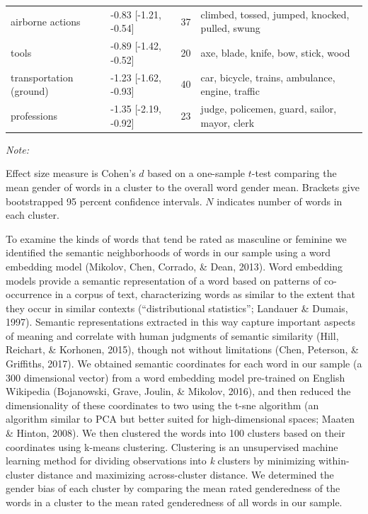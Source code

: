 \documentclass[
  english,
  ,man,floatsintext]{apa6}
\begin{document}
\begin{table}
{\begin{threeparttable}
\begin{tabular}[t]{llrl}
\hspace{1em}airborne actions & -0.83 [-1.21, -0.54] & 37 & climbed, tossed, jumped, knocked, pulled, swung\\
\hspace{1em}tools & -0.89 [-1.42, -0.52] & 20 & axe, blade, knife, bow, stick, wood\\
\hspace{1em}transportation (ground) & -1.23 [-1.62, -0.93] & 40 & car, bicycle, trains, ambulance, engine, traffic\\
\hspace{1em}professions & -1.35 [-2.19, -0.92] & 23 & judge, policemen, guard, sailor, mayor, clerk\\
\bottomrule
\end{tabular}
\begin{tablenotes}[para]
\item \textit{Note:} 
\item Effect size measure is Cohen's $d$ based on a one-sample $t$-test comparing the mean gender of words in a cluster to the overall word gender mean. Brackets give bootstrapped 95 percent confidence intervals. $N$ indicates number of words in each cluster.
\end{tablenotes}
\end{threeparttable}}
\end{table}

To examine the kinds of words that tend be rated as masculine or feminine we identified the semantic neighborhoods of words in our sample using a word embedding model (Mikolov, Chen, Corrado, \& Dean, 2013). Word embedding models provide a semantic representation of a word based on patterns of co-occurrence in a corpus of text, characterizing words as similar to the extent that they occur in similar contexts (``distributional statistics''; Landauer \& Dumais, 1997). Semantic representations extracted in this way capture important aspects of meaning and correlate with human judgments of semantic similarity (Hill, Reichart, \& Korhonen, 2015), though not without limitations (Chen, Peterson, \& Griffiths, 2017). We obtained semantic coordinates for each word in our sample (a 300 dimensional vector) from a word embedding model pre-trained on English Wikipedia (Bojanowski, Grave, Joulin, \& Mikolov, 2016), and then reduced the dimensionality of these coordinates to two using the t-sne algorithm (an algorithm similar to PCA but better suited for high-dimensional spaces; Maaten \& Hinton, 2008). We then clustered the words into 100 clusters based on their coordinates using k-means clustering. Clustering is an unsupervised machine learning method for dividing observations into \emph{k} clusters by minimizing within-cluster distance and maximizing across-cluster distance. We determined the gender bias of each cluster by comparing the mean rated genderedness of the words in a cluster to the mean rated genderedness of all words in our sample.
\end{document}
